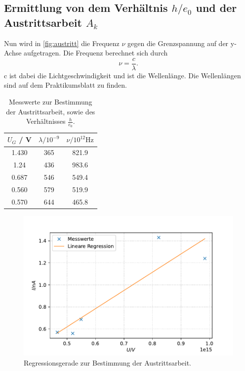 \subsection[Ermittlung von dem Verhältnis h/e und der Austrittsarbeit]{Ermittlung von dem Verhältnis $h / e_0$ und der Austrittsarbeit $A_k$}
Nun wird in \autoref{fig:austritt} die Frequenz $\nu$ gegen die Grenzspannung auf der y-Achse aufgetragen.
Die Frequenz berechnet sich durch
\begin{equation}
  \nu = \frac{c}{\lambda}.
\end{equation}
c ist dabei die Lichtgeschwindigkeit und \lambda ist die Wellenlänge.
Die Wellenlängen sind auf dem Praktikumsblatt \cite{v500} zu finden.

\begin{table}
  \centering
  \caption{Messwerte zur Bestimmung der Austrittsarbeit, sowie des Verhältnisses $\frac{h}{e_0}$.}
  \label{tab:austritt}
  \begin{tabular}{c c c}
    \toprule
    $U_G$ / V & $\lambda / 10^{-9}$ & $\nu / 10^{12} \unit\hertz$ \\
    \midrule
    1.430 & 365 & 821.9\\
    1.24 & 436 & 983.6\\
    0.687 & 546 & 549.4\\
    0.560 & 579 & 519.9\\
    0.570 & 644 & 465.8\\ %
    \bottomrule
  \end{tabular}
\end{table}

\begin{figure}
  \center
  \caption{Regressionsgerade zur Bestimmung der Austrittsarbeit.}\label{fig:austritt}
  \includegraphics[width=0.8\linewidth]{pictures/austritt.pdf}
\end{figure}

